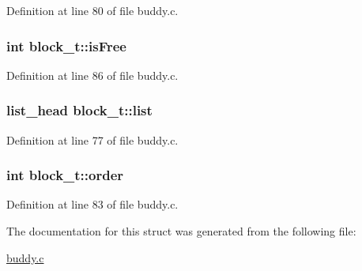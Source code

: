 Definition at line 80 of file buddy.\+c.

\subsubsection[{\texorpdfstring{is\+Free}{isFree}}]{\setlength{\rightskip}{0pt plus 5cm}int block\+\_\+t\+::is\+Free}\hypertarget{structblock__t_a623e67fc2865af94d9d86a7e99de20e4}{}\label{structblock__t_a623e67fc2865af94d9d86a7e99de20e4}


Definition at line 86 of file buddy.\+c.

\subsubsection[{\texorpdfstring{list}{list}}]{ {\bf list\+\_\+head} block\+\_\+t\+::list}\hypertarget{structblock__t_a80d7be33d943c2f81034b125405a3dd4}{}\label{structblock__t_a80d7be33d943c2f81034b125405a3dd4}


Definition at line 77 of file buddy.\+c.

\subsubsection[{\texorpdfstring{order}{order}}]{\setlength{\rightskip}{0pt plus 5cm}int block\+\_\+t\+::order}\hypertarget{structblock__t_a82acc515c2099fec50f6f0b41bfb19ad}{}\label{structblock__t_a82acc515c2099fec50f6f0b41bfb19ad}


Definition at line 83 of file buddy.\+c.



The documentation for this struct was generated from the following file\+:\begin{DoxyCompactItemize}
\item 
\hyperlink{buddy_8c}{buddy.\+c}\end{DoxyCompactItemize}
